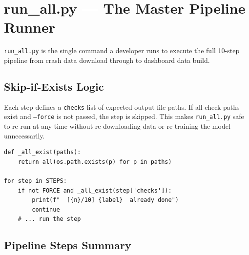 \documentclass[11pt,a4paper,openany]{book}
\begin{document}
\section{run\_all.py --- The Master Pipeline Runner}

\texttt{run\_all.py} is the single command a developer runs to execute the full
10-step pipeline from crash data download through to dashboard data build.

\subsection{Skip-if-Exists Logic}

Each step defines a \texttt{checks} list of expected output file paths.  If all
check paths exist and \texttt{--force} is not passed, the step is skipped.
This makes \texttt{run\_all.py} safe to re-run at any time without re-downloading
data or re-training the model unnecessarily.

\begin{lstlisting}[style=python, caption={Skip-if-exists check in run\_all.py}]
def _all_exist(paths):
    return all(os.path.exists(p) for p in paths)

for step in STEPS:
    if not FORCE and _all_exist(step['checks']):
        print(f"  [{n}/10] {label}  already done")
        continue
    # ... run the step
\end{lstlisting}

\subsection{Pipeline Steps Summary}
\end{document}
